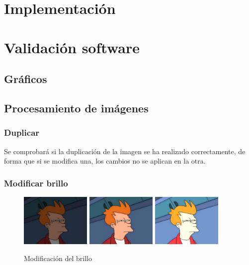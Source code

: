 \section{Implementación}
\section{Validación software}
\subsection{Gráficos}
\subsection{Procesamiento de imágenes}
\subsubsection{Duplicar}
Se comprobará si la duplicación de la imagen se ha realizado correctamente, de forma que si se modifica una, los cambios no se aplican en la otra.
\subsubsection{Modificar brillo}
\vskip0.3cm
\begin{figure}[H]
 \centering
  \includegraphics[width=0.3\textwidth]{imagenes/fryBrilo2.jpg}
  \includegraphics[width=0.3\textwidth]{imagenes/Fry.jpg}
  \includegraphics[width=0.3\textwidth]{imagenes/fryBrillo1.jpg}
 \caption{Modificación del brillo}
 \label{diseño}
\end{figure}
